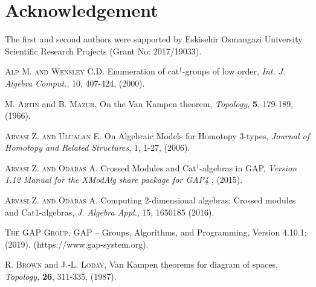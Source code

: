 \documentclass[a4paper,11pt]{article}
\theoremstyle{plain}
\theoremstyle{definition}
\begin{document}
\section*{Acknowledgement}

The first and second authors were supported by Eskisehir Osmangazi
University Scientific Research Projects (Grant No: 2017/19033).

\begin{thebibliography}{99}
	 \textsc{Alp M. and Wensley C.D. } Enumeration of cat$^{1}$-groups 
	of low order, \emph{Int. J. Algebra Comput.}, 10, 407-424, (2000).
	
	 \textsc{M. Artin} and \textsc{B. Mazur}, \textrm{On the Van
		Kampen theorem, }\emph{Topology,} \textbf{5}, 179-189, (1966).
	
	 \textsc{Arvasi Z. and Ulualan E.} On Algebraic Models for
	Homotopy 3-types, \emph{Journal of Homotopy and Related Structures}, 1,
	1-27, (2006).
	
	 \textsc{Arvasi Z. and Odabas A.} Crossed Modules and Cat$%
	^1 $-algebras in \textsf{GAP}, \emph{Version 1.12 Manual for the \textsf{%
			XModAlg} share package for \textsf{GAP}4 }, (2015).
	
	 \textsc{Arvasi Z. and Odabas A.} Computing 2-dimensional
	algebras: Crossed modules and Cat1-algebras, \emph{J. Algebra Appl.}, 15,
	1650185 (2016).
	
	 \textsc{The GAP Group},
	GAP -- Groups, Algorithms, and Programming, Version 4.10.1; (2019). (https://www.gap-system.org).
	
	
	
	
	
	
	 \textsc{R. Brown} and \textsc{J.-L. Loday}, \textrm{Van
		Kampen theorems for diagram of spaces, } \emph{Topology,} \textbf{26},
	311-335, (1987).
	

\end{thebibliography}
\end{document}
